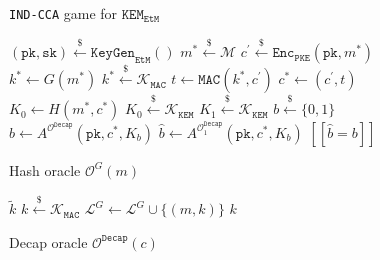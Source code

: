 \documentclass[runningheads]{llncs}
\newcommand{\pke}{\texttt{PKE}}
\newcommand{\keygen}{\texttt{KeyGen}}
\newcommand{\encrypt}{\texttt{Enc}}
\newcommand{\kem}{\texttt{KEM}}
\newcommand{\decap}{\texttt{Decap}}
\newcommand{\etm}{\texttt{EtM}}  %
\newcommand{\mac}{\texttt{MAC}}
\newcommand{\pk}{\texttt{pk}}
\newcommand{\sk}{\texttt{sk}}
\newcommand{\leftsample}{\stackrel{\$}{\leftarrow}}
\newcommand{\llbrack}{[\![}
\newcommand{\rrbrack}{]\!]}
\begin{document}
\begin{figure}[h]
    \centering
    \begin{minipage}[t]{0.46\textwidth}
        \begin{algorithm}[H]
            \caption*{\texttt{IND-CCA} game for $\kem_\etm$}
            \begin{algorithmic}[1]
                \State $(\pk, \sk) \leftsample \keygen_\etm()$
                \State $m^\ast \leftsample \mathcal{M}$
                \State $c^\prime \leftsample \encrypt_\pke(\pk, m^\ast)$
                \State $k^\ast \leftarrow G(m^\ast)$
                \State $k^\ast \leftsample \mathcal{K}_\mac$
                \State $t \leftarrow \mac(k^\ast, c^\prime)$
                \State $c^\ast \leftarrow (c^\prime, t)$
                \State $K_0 \leftarrow H(m^\ast, c^\ast)$
                \State $K_0 \leftsample \mathcal{K}_\kem$
                \State $K_1 \leftsample \mathcal{K}_\kem$
                \State $b \leftsample \{0,1\}$
                \State $\hat{b} \leftarrow A^{\mathcal{O}^\decap}(\pk, c^\ast, K_b)$
                \State $\hat{b} \leftarrow A^{\mathcal{O}^\decap_1}(\pk, c^\ast, K_b)$
                \State \Return $\llbrack \hat{b} = b \rrbrack$
            \end{algorithmic}
        \end{algorithm}\vspace{-4em}
        \begin{algorithm}[H]
            \caption*{Hash oracle $\mathcal{O}^G(m)$}
            \begin{algorithmic}[1]
                    \State \Return $\tilde{k}$
                \EndIf
                \State $k \leftsample \mathcal{K}_\mac$
                \State $\mathcal{L}^G \leftarrow \mathcal{L}^G \cup \{(m, k)\}$
                \State \Return $k$
            \end{algorithmic}
        \end{algorithm}
    \end{minipage}
    \begin{minipage}[t]{0.53\textwidth}
        \begin{algorithm}[H]
            \caption*{Decap oracle $\mathcal{O}^\decap(c)$}
            \begin{algorithmic}[1]

\end{algorithmic}
\end{algorithm}
\end{minipage}
\end{figure}
\end{document}

